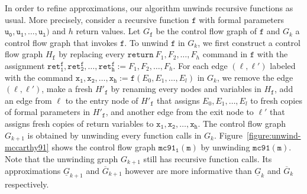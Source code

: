 In order to refine approximations, our algorithm unwinds recursive
functions as usual. More precisely, consider a recursive function
$\mathtt{f}$ with formal parameters $\mathtt{u_0}, \mathtt{u_1},
\ldots, \mathtt{u_l})$ and $h$ return values. Let $G_{\mathtt{f}}$ be
the control flow graph of $\mathtt{f}$ and $G_k$ a control flow graph
that invokes $\mathtt{f}$. To unwind $\mathtt{f}$ in $G_k$, 
we first construct a control flow graph $H_{\mathtt{f}}$ by 
replacing every $\mathtt{return}\ F_1, F_2, \ldots, F_h$ command in
$\mathtt{f}$ with the assignment $\mathtt{ret^f_1}, \mathtt{ret^f_2}, \ldots,
\mathtt{ret^f_h} := F_1, F_2, \ldots, F_h$. For each edge $(\ell,
\ell')$ labeled with the command $\mathtt{x_1}, \mathtt{x_2}, \ldots,
\mathtt{x_h} := \mathtt{f}(E_0, E_1, \ldots, E_l)$ in $G_k$, we remove
the edge $(\ell, \ell')$, make a fresh $H'_{\mathtt{f}}$ by
renaming every nodes and variables in $H_{\mathtt{f}}$, add an edge
from $\ell$ to the entry node of $H'_{\mathtt{f}}$ that assigns $E_0,
E_1, \ldots, E_l$ to fresh copies of formal parameters in
$H'_{\mathtt{f}}$, and another edge from the exit node to $\ell'$ that
assigns fresh copies of return variables to $\mathtt{x_1},
\mathtt{x_2}, \ldots, \mathtt{x_h}$. The control flow graph $G_{k+1}$
is obtained by unwinding every function calls in $G_k$. 
Figure~\ref{figure:unwind-mccarthy91} shows the control flow graph
$\mathtt{mc91_1(m)}$ by unwinding $\mathtt{mc91(m)}$. Note that the
unwinding graph $G_{k+1}$ still has recursive function calls. Its
approximations $\underline{G}_{k+1}$ and $\overline{G}_{k+1}$ however
are more informative than $\underline{G}_k$ and $\overline{G}_k$
respectively. 

